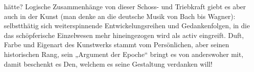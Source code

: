 hätte? Logische Zusammenhänge von dieser Schoss- und Triebkraft giebt es aber auch in der Kunst (man denke an die deutsche Musik von Bach bis Wagner): selbstthätig sich weiterspinnende Entwickelungsreihen und Gedankenfolgen, in die das schöpferische Einzelwesen mehr hineingezogen wird als activ eingreift. Duft, Farbe und Eigenart des Kunstwerks stammt vom Persönlichen, aber seinen historischen Rang, sein „Argument der Epoche“ bringt es von anderswoher mit, damit beschenkt es Den, welchem es seine Gestaltung verdanken will!
\par

